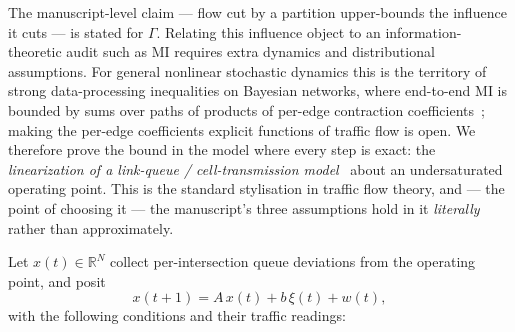 \documentclass[11pt]{article}
\theoremstyle{definition}
\theoremstyle{remark}
\newcommand{\R}{\mathbb{R}}
\begin{document}
The manuscript-level claim --- flow cut by a partition upper-bounds the
influence it cuts --- is stated for $\Gamma$.
Relating this influence object to an information-theoretic audit such as MI
requires extra dynamics and distributional assumptions.
For general nonlinear stochastic dynamics this is the territory of strong
data-processing inequalities on Bayesian networks, where end-to-end MI is
bounded by sums over paths of products of per-edge contraction
coefficients~\citep{evans1999percolation,polyanskiy2017sdpi}; making the
per-edge coefficients explicit functions of traffic flow is open.
We therefore prove the bound in the model where every step is exact: the
\emph{linearization of a link-queue / cell-transmission
    model}~\citep{daganzo1994ctm,jin2012linkqueue} about an undersaturated
operating point.
This is the standard stylisation in traffic flow theory, and --- the point of
choosing it --- the manuscript's three assumptions hold in it \emph{literally}
rather than approximately.

Let $x(t) \in \R^N$ collect per-intersection queue deviations from the
operating point, and posit
\begin{equation}
    x(t+1) = A\, x(t) + b\, \xi(t) + w(t),
    \label{eq:var}
\end{equation}
with the following conditions and their traffic readings:
\end{document}
